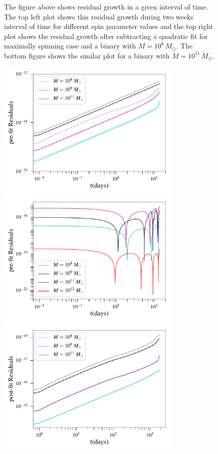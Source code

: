 \documentclass[twocolumn,showpacs,aps,prd,nobibnotes,floatfix]{revtex4-1}
\begin{document}
\begin{widetext}
\begin{figure}
	\caption{The figure above shows residual growth in a given interval of time. The top left plot shows this residual growth during two weeks interval of time for different spin parameter values and the top right plot shows the residual growth after subtracting a quadratic fit for maximally spinning case and a binary with $M = 10^{8}\, M_{\odot}$. The bottom figure shows the similar plot for a binary with $M = 10^{11}\, M_{\odot}$.}
	\label{fig:resedualGrowthTwoweeks}
\end{figure} 

\begin{figure}
	\includegraphics[width=3.5in]{../plots/PlotfromMathematicaData/ResidualGrowth2weeksDiffSpinsInDaysPreFit.pdf}
	\includegraphics[width=3.5in]{../plots/PlotfromMathematicaData/ResidualGrowth2weeksDiffSpinsInDaysPostfit.pdf}
	\includegraphics[width=3.5in]{../plots/PlotfromMathematicaData/ResidualGrowth5YearsDiffSpinsInDaysPrefit.pdf}

\end{figure}
\end{widetext}
\end{document}
